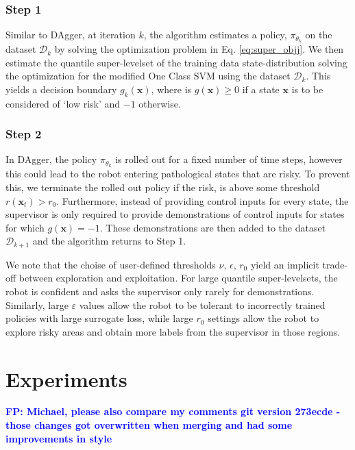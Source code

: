 \documentclass[10pt, conference]{ieeeconf}      %
\newcommand{\bx}{\mathbf{x}}
\newcommand{\fpnote}[1]{\ifthenelse{\boolean{include-notes}}%
 {\textcolor{blue}{\textbf{FP: #1}}}{}}
\begin{document}
\subsubsection{Step 1}

Similar to DAgger, at iteration $k$, the algorithm estimates a policy, $\pi_{\theta_k}$ on the dataset $\mathcal{D}_k$
by solving the optimization problem in Eq. \ref{eq:super_objj}. We then estimate the quantile super-levelset of the
training data state-distribution solving the optimization for the modified One Class SVM using the dataset $\mathcal{D}_k$. 
This yields a decision boundary $g_k(\bx)$, where is $g(\bx)\ge 0$ if a state $\bx$ is to be considered of `low risk' and $-1$ otherwise. 
 
 
 \subsubsection{Step 2}
 In DAgger, the policy $\pi_{\theta_k}$ is rolled out for a fixed number of time steps, however this could lead to the
 robot entering pathological states that are risky. To prevent this, we terminate the rolled out policy if the risk, is
 above some threshold $r(\bx_t) > r_0$.  Furthermore, instead of providing control inputs for every state, the supervisor is only required to 
 provide demonstrations of control inputs for states for which $g(\bx)=-1$.  These demonstrations are then added to the
 dataset $\mathcal{D}_{k+1}$ and the algorithm returns to Step 1. 

We note that the choise of user-defined thresholds $\nu$, $\epsilon$, $r_0$ yield an implicit trade-off
between exploration and exploitation. For large quantile super-levelsets, the robot is confident and asks the
supervisor only rarely for demonstrations. Similarly, large $\varepsilon$ values allow the robot to be tolerant to
incorrectly trained policies with large surrogate loss, while large $r_0$ settings allow the robot to explore risky
areas and obtain more labels from the supervisor in those regions.


\section{Experiments}
\fpnote{Michael, please also compare my comments git version 273ecde - those changes got overwritten when merging and
had some improvements in style}
\end{document}
